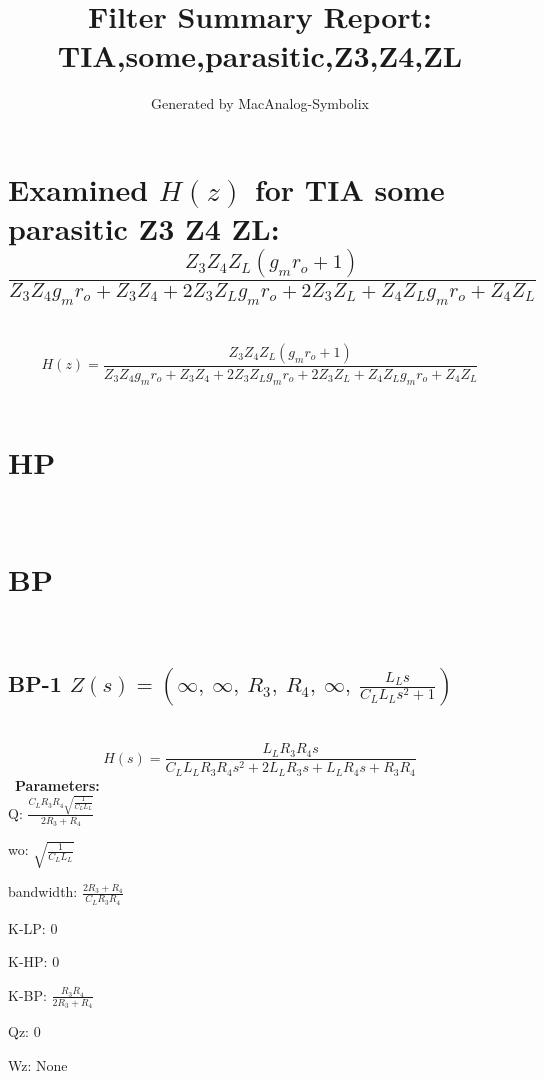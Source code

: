 \documentclass{article}
\begin{document}
        
                        \title{Filter Summary Report: TIA,some,parasitic,Z3,Z4,ZL}
                        \author{Generated by MacAnalog-Symbolix}
                        \maketitle

                        \tableofcontents
                        \newpage
                        \section{Examined $H(z)$ for TIA some parasitic Z3 Z4 ZL: $\frac{Z_{3} Z_{4} Z_{L} \left(g_{m} r_{o} + 1\right)}{Z_{3} Z_{4} g_{m} r_{o} + Z_{3} Z_{4} + 2 Z_{3} Z_{L} g_{m} r_{o} + 2 Z_{3} Z_{L} + Z_{4} Z_{L} g_{m} r_{o} + Z_{4} Z_{L}}$ }\ 
\textbf{\[H(z) = \frac{Z_{3} Z_{4} Z_{L} \left(g_{m} r_{o} + 1\right)}{Z_{3} Z_{4} g_{m} r_{o} + Z_{3} Z_{4} + 2 Z_{3} Z_{L} g_{m} r_{o} + 2 Z_{3} Z_{L} + Z_{4} Z_{L} g_{m} r_{o} + Z_{4} Z_{L}}\] }\ 
\section{HP}\ 
\section{BP}\ 
\subsection{BP-1 $Z(s) = \left( \infty, \  \infty, \  R_{3}, \  R_{4}, \  \infty, \  \frac{L_{L} s}{C_{L} L_{L} s^{2} + 1}\right)$ } \ 
\textbf{\[H(s) = \frac{L_{L} R_{3} R_{4} s}{C_{L} L_{L} R_{3} R_{4} s^{2} + 2 L_{L} R_{3} s + L_{L} R_{4} s + R_{3} R_{4}}\] } \ 
\textbf{Parameters:}\\ 

Q: $\frac{C_{L} R_{3} R_{4} \sqrt{\frac{1}{C_{L} L_{L}}}}{2 R_{3} + R_{4}}$\ 

wo: $\sqrt{\frac{1}{C_{L} L_{L}}}$\ 

bandwidth: $\frac{2 R_{3} + R_{4}}{C_{L} R_{3} R_{4}}$\ 

K-LP: $0$\ 

K-HP: $0$\ 

K-BP: $\frac{R_{3} R_{4}}{2 R_{3} + R_{4}}$\ 

Qz: $0$\ 

Wz: $\text{None}$\ 
\end{document}
